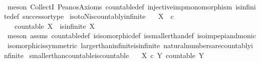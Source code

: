 \begin{isabellebody}
%
\isadelimproof
\ \ %
\endisadelimproof
%
\isatagproof
{}\isamarkupfalse%
\ {\isacharparenleft}{\kern0pt}meson\ CollectI\ Peano{\isacharprime}{\kern0pt}s{\isacharunderscore}{\kern0pt}Axioms\ countable{\isacharunderscore}{\kern0pt}def\ injective{\isacharunderscore}{\kern0pt}imp{\isacharunderscore}{\kern0pt}monomorphism\ is{\isacharunderscore}{\kern0pt}infinite{\isacharunderscore}{\kern0pt}def\ successor{\isacharunderscore}{\kern0pt}type{\isacharparenright}{\kern0pt}%
\endisatagproof
{\isafoldproof}%
%
\isadelimproof
\isanewline
%
\endisadelimproof
\isanewline
{}\isamarkupfalse%
\ iso{\isacharunderscore}{\kern0pt}to{\isacharunderscore}{\kern0pt}N{\isacharunderscore}{\kern0pt}is{\isacharunderscore}{\kern0pt}countably{\isacharunderscore}{\kern0pt}infinite{\isacharcolon}{\kern0pt}\isanewline
\ \ \ {\isachardoublequoteopen}X\ {\isasymcong}\ {\isasymnat}\isactrlsub c{\isachardoublequoteclose}\isanewline
\ \ \ {\isachardoublequoteopen}{\isacharparenleft}{\kern0pt}countable\ X{\isacharparenright}{\kern0pt}\ {\isasymand}\ {\isacharparenleft}{\kern0pt}is{\isacharunderscore}{\kern0pt}infinite\ X{\isacharparenright}{\kern0pt}{\isachardoublequoteclose}\isanewline
%
\isadelimproof
\ \ %
\endisadelimproof
%
\isatagproof
{}\isamarkupfalse%
\ {\isacharparenleft}{\kern0pt}meson\ assms\ countable{\isacharunderscore}{\kern0pt}def\ is{\isacharunderscore}{\kern0pt}isomorphic{\isacharunderscore}{\kern0pt}def\ is{\isacharunderscore}{\kern0pt}smaller{\isacharunderscore}{\kern0pt}than{\isacharunderscore}{\kern0pt}def\ iso{\isacharunderscore}{\kern0pt}imp{\isacharunderscore}{\kern0pt}epi{\isacharunderscore}{\kern0pt}and{\isacharunderscore}{\kern0pt}monic\ isomorphic{\isacharunderscore}{\kern0pt}is{\isacharunderscore}{\kern0pt}symmetric\ larger{\isacharunderscore}{\kern0pt}than{\isacharunderscore}{\kern0pt}infinite{\isacharunderscore}{\kern0pt}is{\isacharunderscore}{\kern0pt}infinite\ natural{\isacharunderscore}{\kern0pt}numbers{\isacharunderscore}{\kern0pt}are{\isacharunderscore}{\kern0pt}countably{\isacharunderscore}{\kern0pt}infinite{\isacharparenright}{\kern0pt}%
\endisatagproof
{\isafoldproof}%
%
\isadelimproof
\isanewline
%
\endisadelimproof
\isanewline
{}\isamarkupfalse%
\ smaller{\isacharunderscore}{\kern0pt}than{\isacharunderscore}{\kern0pt}countable{\isacharunderscore}{\kern0pt}is{\isacharunderscore}{\kern0pt}countable{\isacharcolon}{\kern0pt}\isanewline
\ \ \ {\isachardoublequoteopen}X\ {\isasymle}\isactrlsub c\ Y{\isachardoublequoteclose}\ {\isachardoublequoteopen}countable\ Y{\isachardoublequoteclose}\isanewline

\end{isabellebody}
